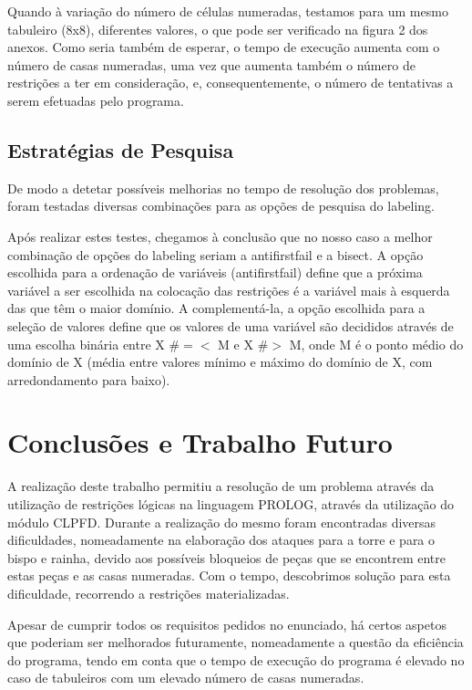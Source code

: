 \documentclass[runningheads]{llncs}
\begin{document}
Quando à variação do número de células numeradas, testamos para um mesmo tabuleiro (8x8), diferentes valores, o que pode ser verificado na figura 2 dos anexos.
Como seria também de esperar, o tempo de execução aumenta com o número de casas numeradas, uma vez que aumenta também o número de restrições a ter em consideração, e, consequentemente, o número de tentativas a serem efetuadas pelo programa.

\subsection{Estratégias de Pesquisa}

De modo a detetar possíveis melhorias no tempo de resolução dos problemas, foram testadas diversas combinações para as opções de pesquisa do labeling. 

Após realizar estes testes, chegamos à conclusão que no nosso caso a melhor combinação de opções do labeling seriam a anti\textunderscore first\textunderscore fail e
 a bisect.
A opção escolhida para a ordenação de variáveis (anti\textunderscore first\textunderscore fail) define que a próxima variável a ser escolhida na colocação 
das restrições é a variável mais à esquerda das que têm o maior domínio.
A complementá-la, a opção escolhida para a seleção de valores define que os valores de uma 
variável são decididos através de uma escolha binária entre X  \#$=<$ M e X  \#$>$ M, onde M 
é o ponto médio do domínio de X (média entre valores mínimo e máximo do domínio de X, 
com arredondamento para baixo).

\newpage
\section{Conclusões e Trabalho Futuro}

A realização deste trabalho permitiu a resolução de um problema através da utilização de restrições lógicas na linguagem PROLOG,
através da utilização do módulo CLPFD.
Durante a realização do mesmo foram encontradas diversas dificuldades, nomeadamente na elaboração dos ataques para a torre e para o bispo e rainha, devido aos possíveis bloqueios de peças que se encontrem entre estas peças e as casas numeradas.
Com o tempo, descobrimos solução para esta dificuldade, recorrendo a restrições materializadas.

Apesar de cumprir todos os requisitos pedidos no enunciado, há certos aspetos que poderiam ser melhorados futuramente, nomeadamente a questão da eficiência do programa, tendo em conta que o tempo de execução do programa
é elevado no caso de tabuleiros com um elevado número de casas numeradas.
\end{document}
